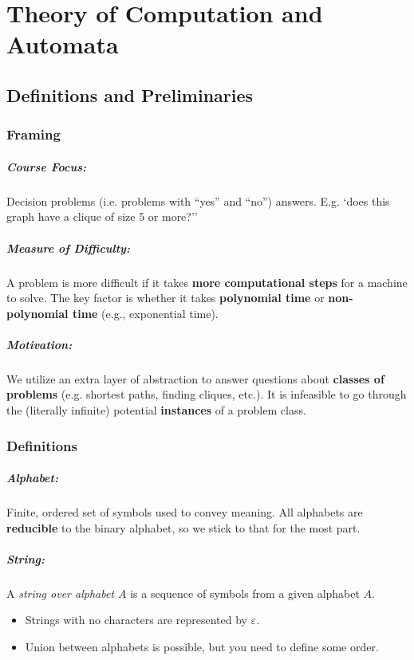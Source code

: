 \documentclass[a4paper,12pt]{report}
\begin{document}
\chapter{Theory of Computation and Automata}

\section{Definitions and Preliminaries}

\subsection{Framing}

\paragraph{Course Focus: } Decision problems (i.e. problems with ``yes'' and ``no'') answers. E.g. `does this graph have a clique of size 5 or more?''

\paragraph{Measure of Difficulty: } A problem is more difficult if it takes \textbf{more computational steps} for a machine to solve. The key factor is whether it takes \textbf{polynomial time} or \textbf{non-polynomial time} (e.g., exponential time).

\paragraph{Motivation: } We utilize an extra layer of abstraction to answer questions about \textbf{classes of problems} (e.g. shortest paths, finding cliques, etc.). It is infeasible to go through the (literally infinite) potential \textbf{instances} of a problem class. 

\subsection{Definitions}

\paragraph{Alphabet: } Finite, ordered set of symbols used to convey meaning. All alphabets are \textbf{reducible} to the binary alphabet, so we stick to that for the most part. 

\paragraph{String: } A \textit{string over alphabet $A$} is a sequence of symbols from a given alphabet $A$. 
\begin{itemize}
\item Strings with no characters are represented by $\varepsilon$.
\item Union between alphabets is possible, but you need to define some order.
\end{itemize}
\end{document}
